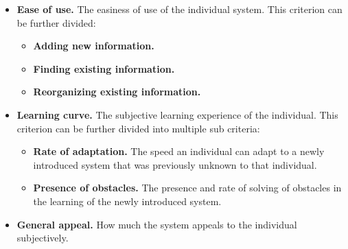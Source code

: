 \begin{itemize}
\item \textbf{Ease of use.} The easiness of use of the individual system. This criterion can be further divided:
\begin{itemize}
\item \textbf{Adding new information.}
\item \textbf{Finding existing information.}
\item \textbf{Reorganizing existing information.}
\end{itemize}
\item \textbf{Learning curve.} The subjective learning experience of the individual. This criterion can be further divided into multiple sub criteria:
\begin{itemize}
\item \textbf{Rate of adaptation.} The speed an individual can adapt to a newly introduced system that was previously unknown to that individual.
\item \textbf{Presence of obstacles.} The presence and rate of solving of obstacles in the learning of the newly introduced system.
\end{itemize}
\item \textbf{General appeal.} How much the system appeals to the individual subjectively.
\end{itemize}

\fi
